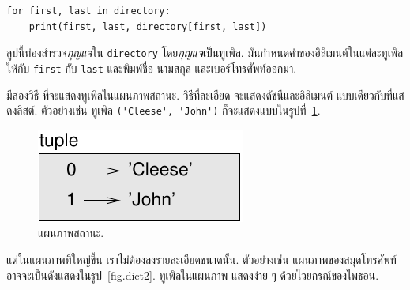 %
%
\begin{verbatim}
for first, last in directory:
    print(first, last, directory[first, last])
\end{verbatim}
%
ลูปนี้ท่องสำรวจ\textit{กุญแจ}ใน \texttt{directory}
โดย\textit{กุญแจ}เป็นทูเพิล.
มันกำหนดค่าของอิลิเมนต์ในแต่ละทูเพิลให้กับ \texttt{first} กับ \texttt{last}
และพิมพ์ชื่อ นามสกุล และเบอร์โทรศัพท์ออกมา.


%
มีสองวิธี ที่จะแสดงทูเพิลในแผนภาพสถานะ.
วิธีที่ละเอียด จะแสดงดัชนีและอิลิเมนต์ แบบเดียวกับที่แสดงลิสต์.
ตัวอย่างเช่น ทูเพิล \verb|('Cleese', 'John')|
ก็จะแสดงแบบในรูปที่~\ref{fig.tuple1}.
%

\begin{figure}
\centerline
{\includegraphics[scale=0.8]{figs/tuple1.pdf}}
\caption{แผนภาพสถานะ.}
\label{fig.tuple1}
\end{figure}

%
แต่ในแผนภาพที่ใหญ่ขึ้น เราไม่ต้องลงรายละเอียดขนาดนั้น.
ตัวอย่างเช่น แผนภาพของสมุดโทรศัพท์ อาจจะเป็นดังแสดงในรูป~\ref{fig.dict2}.
%
%
ทูเพิลในแผนภาพ แสดงง่าย ๆ ด้วยไวยกรณ์ของไพธอน.

